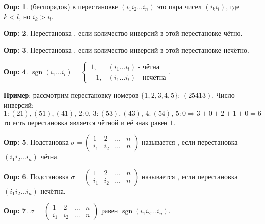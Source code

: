 \documentclass[12pt]{article}
\theoremstyle{definition}
\newtheorem{defn}{Опр:}
\DeclareMathOperator{\sgn}{sgn}
\begin{document}
\begin{defn}
	 (беспорядок) в перестановке $(i_1i_2 \dotsc i_n)$ это пара чисел $(i_k i_l)$, где $k < l$, но $i_k > i_l$.
\end{defn}
\begin{defn}
	Перестановка , если количество инверсий в этой перестановке чётно.
\end{defn}
\begin{defn}
	Перестановка , если количество инверсий в этой перестановке нечётно.
\end{defn}
\begin{defn}
	 $\sgn{(i_1\dotsc i_l)} = 
	\begin{cases}
		1, & (i_1\dotsc i_l) \text{ - чётна}\\
		-1, & (i_1\dotsc i_l) \text{ - нечётна}
	\end{cases}$.
\end{defn}

\textbf{Пример}: рассмотрим перестановку номеров $\{1,2,3,4, 5\}$: $(25413)$. Число инверсий:
$$
	1 \colon (21), (51), (41), \, 2 \colon 0, \, 3 \colon (53), (43), \, 4 \colon (54), \, 5 \colon 0 \Rightarrow 3 + 0 + 2 + 1 + 0 = 6
$$
то есть перестановка является чётной и её знак равен $1$.
\begin{defn}
	Подстановка $\sigma = \begin{pmatrix}
		1 & 2 & \dotsc & n\\
		i_1 & i_2 & \dotsc & n
	\end{pmatrix}$ называется , если перестановка $(i_1 i_2 \dotsc i_n)$ чётна.
\end{defn}
\begin{defn}
	Подстановка $\sigma = \begin{pmatrix}
		1 & 2 & \dotsc & n\\
		i_1 & i_2 & \dotsc & n
	\end{pmatrix}$ называется , если перестановка $(i_1 i_2 \dotsc i_n)$ нечётна.
\end{defn}
\newpage
\begin{defn}
	 $\sigma = \begin{pmatrix}
		1 & 2 & \dotsc & n\\
		i_1 & i_2 & \dotsc & n
	\end{pmatrix}$ равен $\sgn{(i_1 i_2 \dotsc i_n)}$.
\end{defn}
\end{document}
